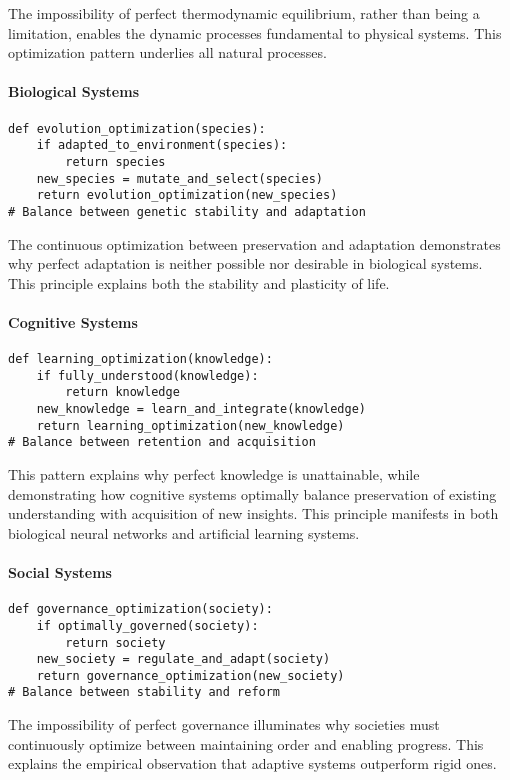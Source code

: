\documentclass[12pt]{article}
\begin{document}
The impossibility of perfect thermodynamic equilibrium, rather than being a limitation, enables the dynamic processes fundamental to physical systems. This optimization pattern underlies all natural processes.

\paragraph{Biological Systems}
\begin{verbatim}
def evolution_optimization(species):
    if adapted_to_environment(species):
        return species
    new_species = mutate_and_select(species)
    return evolution_optimization(new_species)
# Balance between genetic stability and adaptation
\end{verbatim}

The continuous optimization between preservation and adaptation demonstrates why perfect adaptation is neither possible nor desirable in biological systems. This principle explains both the stability and plasticity of life.

\paragraph{Cognitive Systems}
\begin{verbatim}
def learning_optimization(knowledge):
    if fully_understood(knowledge):
        return knowledge
    new_knowledge = learn_and_integrate(knowledge)
    return learning_optimization(new_knowledge)
# Balance between retention and acquisition
\end{verbatim}

This pattern explains why perfect knowledge is unattainable, while demonstrating how cognitive systems optimally balance preservation of existing understanding with acquisition of new insights. This principle manifests in both biological neural networks and artificial learning systems.

\paragraph{Social Systems}
\begin{verbatim}
def governance_optimization(society):
    if optimally_governed(society):
        return society
    new_society = regulate_and_adapt(society)
    return governance_optimization(new_society)
# Balance between stability and reform
\end{verbatim}

The impossibility of perfect governance illuminates why societies must continuously optimize between maintaining order and enabling progress. This explains the empirical observation that adaptive systems outperform rigid ones.
\end{document}
